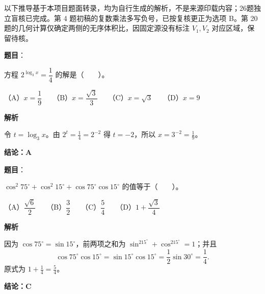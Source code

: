 

\begin{gktip}
以下推导基于本项目题面转录，均为自行生成的解析，不是来源印载内容；26题独立盲核已完成。第 4 题初稿的复数乘法多写负号，已按复核更正为选项 B。第 20 题的几何计算仅确定两侧的无序体积比，因固定源没有标注 $V_1,V_2$ 对应区域，保留待核。
\end{gktip}

\begin{answer}

\textbf{题目}：

方程 $2^{\log_3 x}=\dfrac14$ 的解是\mbox{（　　）}。

（A）$x=\dfrac19$　　（B）$x=\dfrac{\sqrt3}{3}$　　（C）$x=\sqrt3$　　（D）$x=9$

\textbf{解析}

令 $t=\log_3x$。由 $2^t=\frac14=2^{-2}$ 得 $t=-2$，所以 $x=3^{-2}=\frac19$。

\textbf{结论：A}


\end{answer}
\begin{answer}

\textbf{题目}：

$\cos^2 75^\circ+\cos^2 15^\circ+\cos75^\circ\cos15^\circ$ 的值等于\mbox{（　　）}。

（A）$\dfrac{\sqrt6}{2}$　　（B）$\dfrac32$　　（C）$\dfrac54$　　（D）$1+\dfrac{\sqrt3}{4}$

\textbf{解析}

因为 $\cos75^\circ=\sin15^\circ$，前两项之和为 $\sin^215^\circ+\cos^215^\circ=1$；并且
\nopagebreak[4]
\[
\cos75^\circ\cos15^\circ=\sin15^\circ\cos15^\circ=\frac12\sin30^\circ=\frac14.
\]
原式为 $1+\frac14=\frac54$。

\textbf{结论：C}


\end{answer}
